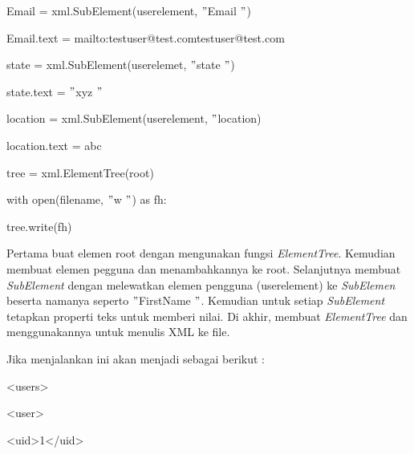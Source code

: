\noindent 
{\fontsize{10pt}{10pt}\selectfont Email = xml.SubElement(userelement,  $ " $Email $ " $)} \par
\noindent 
{\fontsize{10pt}{10pt}\selectfont Email.text = {mailto:testuser@test.com}{testuser@test.com}
} \par
\vspace{10pt}
\noindent 
{\fontsize{10pt}{10pt}\selectfont state = xml.SubElement(userelemet,  $ " $state $ " $)} \par
\noindent 
{\fontsize{10pt}{10pt}\selectfont state.text =  $ " $xyz $ " $} \par
\vspace{10pt}
\noindent 
{\fontsize{10pt}{10pt}\selectfont location = xml.SubElement(userelement,  $ " $location)} \par
\noindent 
{\fontsize{10pt}{10pt}\selectfont location.text = abc} \par
\vspace{10pt}
\noindent 
{\fontsize{10pt}{10pt}\selectfont tree = xml.ElementTree(root)} \par
\noindent 
{\fontsize{10pt}{10pt}\selectfont with open(filename,  $ " $w $ " $) as fh:} \par
\noindent 
{\fontsize{10pt}{10pt}\selectfont tree.write(fh)} \par
\vspace{10pt}
\noindent 
 \hspace*{0.5in} Pertama buat elemen root dengan mengunakan fungsi \textit{ElementTree}. Kemudian membuat elemen pegguna dan menambahkannya ke root. Selanjutnya membuat \textit{SubElement }dengan melewatkan elemen pengguna (userelement) ke \textit{SubElemen} beserta namanya seperto  $ " $FirstName $ " $. Kemudian untuk setiap \textit{SubElement} tetapkan properti teks untuk memberi nilai. Di akhir, membuat \textit{ElementTree} dan menggunakannya untuk menulis XML ke file. \par
\noindent 
 \hspace*{0.5in} Jika menjalankan ini akan menjadi sebagai berikut : \par
\noindent 
 {\fontsize{10pt}{10pt}\selectfont <users>} \par
\noindent 
{\fontsize{10pt}{10pt}\selectfont  \hspace*{0.5in} <user>} \par
\noindent 
{\fontsize{10pt}{10pt}\selectfont  \hspace*{0.5in}  \hspace*{0.5in} <uid>1</uid>} \par
